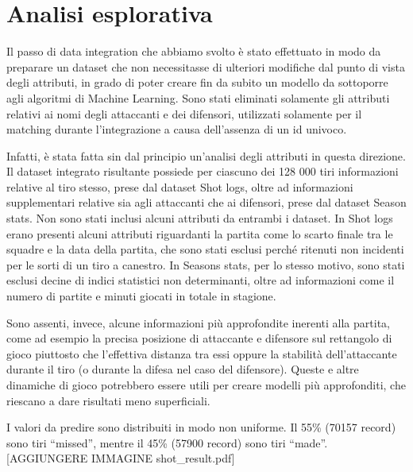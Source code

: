 \section{Analisi esplorativa}

Il passo di data integration che abbiamo svolto è stato effettuato in modo da preparare un dataset che non necessitasse di ulteriori modifiche dal punto di vista degli attributi, in grado di poter creare fin da subito un modello da sottoporre agli algoritmi di Machine Learning. Sono stati eliminati solamente gli attributi relativi ai nomi degli attaccanti e dei difensori, utilizzati solamente per il matching durante l’integrazione a causa dell’assenza di un id univoco.

\par
Infatti, è stata fatta sin dal principio un’analisi degli attributi in questa direzione. Il dataset integrato risultante possiede per ciascuno dei 128 000 tiri informazioni relative al tiro stesso, prese dal dataset Shot logs, oltre ad informazioni supplementari relative sia agli attaccanti che ai difensori, prese dal dataset Season stats. Non sono stati inclusi alcuni attributi da entrambi i dataset. In Shot logs erano presenti alcuni attributi riguardanti la partita come lo scarto finale tra le squadre e la data della partita, che sono stati esclusi perché ritenuti non incidenti per le sorti di un tiro a canestro. In Seasons stats, per lo stesso motivo, sono stati esclusi decine di indici statistici non determinanti, oltre ad informazioni come il numero di partite e minuti giocati in totale in stagione.

\par
Sono assenti, invece, alcune informazioni più approfondite inerenti alla partita, come ad esempio la precisa posizione di attaccante e difensore sul rettangolo di gioco piuttosto che l’effettiva distanza tra essi oppure la stabilità dell’attaccante durante il tiro (o durante la difesa nel caso del difensore). Queste e altre dinamiche di gioco potrebbero essere utili per creare modelli più approfonditi, che riescano a dare risultati meno superficiali.

\par
I valori da predire sono distribuiti in modo non uniforme. Il 55\% (70157 record) sono tiri “missed”, mentre il 45\% (57900 record) sono tiri “made”. [AGGIUNGERE IMMAGINE shot_result.pdf]
